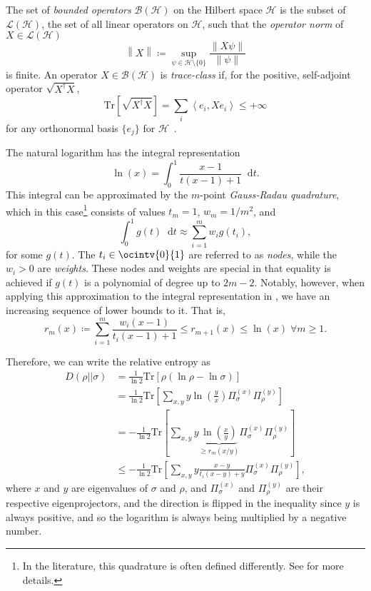 \documentclass[10pt, a4paper]{article}
\numberwithin{equation}{section} %
\theoremstyle{definition}
\theoremstyle{plain}
\newcommand{\norm}[1]{\left\lVert#1\right\rVert}
\newcommand{\dif}{\mathop{}\!\mathrm{d}} %
\newcommand{\?}{\mathrel{?}} %
\newcommand{\angleb}[1]{\left\langle #1 \right\rangle} %
\newcommand{\Tr}{\mathrm{Tr}} %
\newcommand{\Hs}{\mathcal{H}} %
\begin{document}
    The set of \emph{bounded operators} \(\mathcal{B}(\Hs)\) on the Hilbert space \(\Hs\) is the subset of \(\mathcal{L}(\Hs)\), the set of all linear operators on \(\Hs\), such that the \emph{operator norm} of \(X \in \mathcal{L}(\Hs)\)
      \[ \norm{X} \coloneqq \sup_{\psi \in \Hs \setminus \{0\}} \frac{\norm{X\psi}}{\norm{\psi}} \]
      is finite. An operator \(X \in \mathcal{B}(\Hs)\) is \emph{trace-class} if, for the positive, self-adjoint operator \(\sqrt{X^{\dagger}X}\),
      \[ \Tr\left[ \sqrt{X^{\dagger}X} \right] = \sum_{i} \angleb{e_i, Xe_i} \leq +\infty \]
      for any orthonormal basis \(\{e_j\}\) for \(\Hs\)~\cite{HallQuantumForMath}. 

      The natural logarithm has the integral representation
      \begin{equation}
        \ln\left(x\right) = \int_{0}^{1} \frac{x-1}{t(x-1) + 1} \dif{t}.\label{eqn:integral_log}
      \end{equation}
      This integral can be approximated by the \(m\)-point \emph{Gauss-Radau quadrature}, which in this case\footnote{In the literature, this quadrature is often defined differently. See  for more details.} consists of values \(t_m = 1\), \(w_m = 1/m^2\), and
      \begin{equation}
        \int_{0}^{1} g(t) \dif{t} \approx \sum_{i=1}^m w_i g(t_i),
      \end{equation}
      for some \(g(t)\). The \(t_i \in \ocintv{0}{1}\) are referred to as \emph{nodes}, while the \(w_i > 0\) are \emph{weights}. These nodes and weights are special in that equality is achieved if \(g(t)\) is a polynomial of degree up to \(2m-2\). Notably, however, when applying this approximation to the integral representation in , we have an increasing sequence of lower bounds to it. That is,
      \begin{equation}
        r_m(x) \coloneqq \sum_{i=1}^m \frac{w_i(x-1)}{t_i(x-1) + 1} \leq r_{m+1}(x) \leq \ln\left(x\right) \;\forall m \geq 1.
      \end{equation}

      Therefore, we can write the relative entropy as
      \begin{align}
        D(\rho||\sigma) &= \frac{1}{\ln 2} \Tr\left[\rho \left(\ln\rho - \ln\sigma\right) \right] \\
                        &= \frac{1}{\ln 2} \Tr\left[ \sum_{x,y} y \ln\left(\frac{y}{x}\right) \Pi^{(x)}_{\sigma} \Pi^{(y)}_{\rho}  \right] \label{eqn:finitedim_relent} \\ 
                        &= -\frac{1}{\ln 2} \Tr\left[ \sum_{x,y} y \underbrace{\ln\left(\frac{x}{y}\right)}_{\geq r_m(x/y)} \Pi^{(x)}_{\sigma} \Pi^{(y)}_{\rho} \right] \\
                        &\leq -\frac{1}{\ln 2} \Tr\left[ \sum_{x,y} y \frac{x-y}{t_i(x-y)+y} \Pi^{(x)}_{\sigma} \Pi^{(y)}_{\rho} \right],
      \end{align}
      where \(x\) and \(y\) are eigenvalues of \(\sigma\) and \(\rho\), and \(\Pi^{(x)}_{\sigma}\) and \(\Pi^{(y)}_{\rho}\) are their respective eigenprojectors, and the direction is flipped in the inequality since \(y\) is always positive, and so the logarithm is always being multiplied by a negative number.
\end{document}
